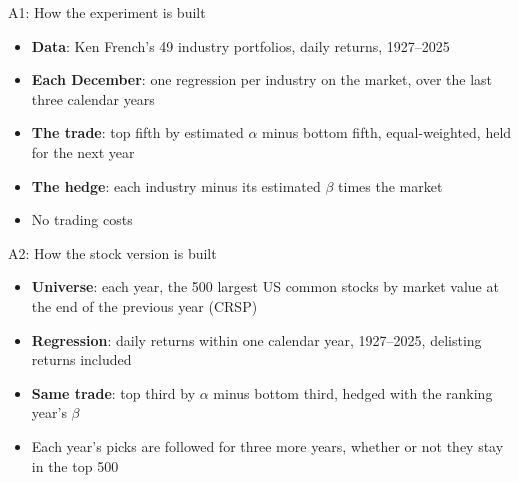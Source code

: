 \documentclass[aspectratio=169,10pt]{beamer}
\begin{document}
\begin{frame}[label=appendix_a1]{A1: How the experiment is built}
\begin{itemize}
\item \textbf{Data}: Ken French's 49 industry portfolios, daily returns, 1927--2025
\vskip 10pt
\item \textbf{Each December}: one regression per industry on the market, over the last three calendar years
\vskip 10pt
\item \textbf{The trade}: top fifth by estimated $\alpha$ minus bottom fifth, equal-weighted, held for the next year
\vskip 10pt
\item \textbf{The hedge}: each industry minus its estimated $\beta$ times the market
\vskip 10pt
\item No trading costs
\end{itemize}
\vskip 8pt
\hfill \hyperlink{experiment}{}
\end{frame}

\begin{frame}[label=appendix_a2]{A2: How the stock version is built}
\begin{itemize}
\item \textbf{Universe}: each year, the 500 largest US common stocks by market value at the end of the previous year (CRSP)
\vskip 10pt
\item \textbf{Regression}: daily returns within one calendar year, 1927--2025, delisting returns included
\vskip 10pt
\item \textbf{Same trade}: top third by $\alpha$ minus bottom third, hedged with the ranking year's $\beta$
\vskip 10pt
\item Each year's picks are followed for three more years, whether or not they stay in the top 500
\end{itemize}
\vskip 8pt
\hfill \hyperlink{think_stocks}{}
\end{frame}

\end{document}

